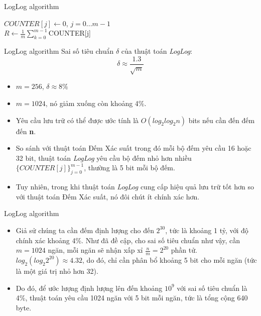 \documentclass[10pt]{beamer}
\begin{document}
\begin{frame}{LogLog algorithm}
  \begin{algorithm}[H]
    \vspace{0.25cm}
    \DontPrintSemicolon
    \LinesNumberedHidden
    \caption[]{Estimatin cardinality with \textit{LogLog}}
    $COUNTER[j] \gets $0, $j = 0...m - 1$\\
    $R \gets \frac{1}{m} \sum\limits_{k=0}^{m-1}$COUNTER[j] \\
    \vspace{0.25cm}
\end{algorithm}
\end{frame}

\begin{frame}{LogLog algorithm}
Sai số tiêu chuẩn $\delta$ của thuật toán \textit{LogLog}:
\[\delta \approx \frac{1.3}{\sqrt{m}}\]
\begin{itemize}
  \item $m = 256$, $\delta \approx 8\%$
  \item $m = 1024$, nó giảm xuống còn khoảng 4\%.
  \item Yêu cầu lưu trữ có thể được ước tính là $O(log_2log_2n)$ bits nếu cần đến đếm đến \textbf{n}.
  \item So sánh với thuật toán Đếm Xác suất trong đó mỗi bộ đếm yêu cầu 16 hoặc 32 bit, thuật toán \textit{LogLog} yêu cầu bộ đếm nhỏ hơn 
nhiều $\{COUNTER[j]\}_{j=0}^{m-1}$, thường là 5 bit mỗi bộ đếm. 
\item Tuy nhiên, trong khi thuật toán \textit{LogLog} cung cấp hiệu quả lưu trữ tốt hơn 
so với thuật toán Đếm Xác suất, nó đôi chút ít chính xác hơn.
\end{itemize}

\end{frame}

\begin{frame}{LogLog algorithm}
\begin{itemize}
  \item Giả sử chúng ta cần đếm định lượng cho đến $2^{30}$, tức là khoảng 1 tỷ, với độ chính xác khoảng 4\%. Như đã đề cập, cho sai số tiêu chuẩn như vậy, 
cần $m = 1024$ ngăn, mỗi ngăn sẽ nhận xấp xỉ $\frac{n}{m} = 2^{20}$ phần tử.
$log_2\left(log_{2}2^{20}\right) \approx 4.32$, do đó, chỉ cần phân bổ khoảng 5 bit cho mỗi ngăn (tức là một giá trị nhỏ hơn 32).
	\item Do đó, để ước lượng định lượng lên đến khoảng $10^9$ với sai số tiêu chuẩn là 4\%, thuật toán yêu cầu 1024 ngăn với 5 bit mỗi ngăn, 
tức là tổng cộng 640 byte.
\end{itemize}

\end{frame}
\end{document}
